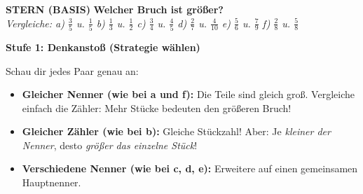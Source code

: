 \documentclass[a4paper,10pt]{article}
\newcommand{\mFrac}[2]{\frac{#1}{#2}}
\begin{document}

\begin{tcolorbox}[
    enhanced, colback=white, colframe=primaryBlue, arc=3mm, boxrule=1.2pt,
    left=4.5mm, right=4.5mm, top=2.5mm, bottom=2.5mm, height=12.9cm
]
    \begin{center}
        {\color{lvlGreen}\textbf{\faStar{} STERN (BASIS)}}\quad
        {\color{primaryBlue}\large\bfseries {}\quad Welcher Bruch ist größer?}\\[1mm]
        {\footnotesize\textit{Vergleiche: a) $\mFrac{3}{5}$ u. $\mFrac{1}{5}$ \quad b) $\mFrac{1}{3}$ u. $\mFrac{1}{2}$ \quad c) $\mFrac{3}{4}$ u. $\mFrac{4}{5}$ \quad d) $\mFrac{2}{7}$ u. $\mFrac{4}{10}$ \quad e) $\mFrac{5}{6}$ u. $\mFrac{7}{9}$ \quad f) $\mFrac{2}{8}$ u. $\mFrac{5}{8}$}}
    \end{center}
    \vspace{0.5mm}

    \begin{tcolorbox}[colback=step1Bg, colframe=step1Border, arc=2mm, boxrule=0.7pt, left=3mm, right=3mm, top=1.8mm, bottom=1.8mm]
        {\color{step1Text}\bfseries\faLightbulb\enskip Stufe 1: Denkanstoß (Strategie wählen)}\\[0.8mm]
        {\small
        Schau dir jedes Paar genau an:
        \begin{itemize}[leftmargin=4mm, itemsep=0.2pt, topsep=1pt]
            \item \textbf{Gleicher Nenner (wie bei a und f):} Die Teile sind gleich groß. Vergleiche einfach die Zähler: Mehr Stücke bedeuten den größeren Bruch!
            \item \textbf{Gleicher Zähler (wie bei b):} Gleiche Stückzahl! Aber: Je \textit{kleiner der Nenner}, desto \textit{größer das einzelne Stück}!
            \item \textbf{Verschiedene Nenner (wie bei c, d, e):} Erweitere auf einen gemeinsamen Hauptnenner.
        \end{itemize}
        }
    \end{tcolorbox}
    \vspace{0.8mm}


\end{tcolorbox}
\end{document}
